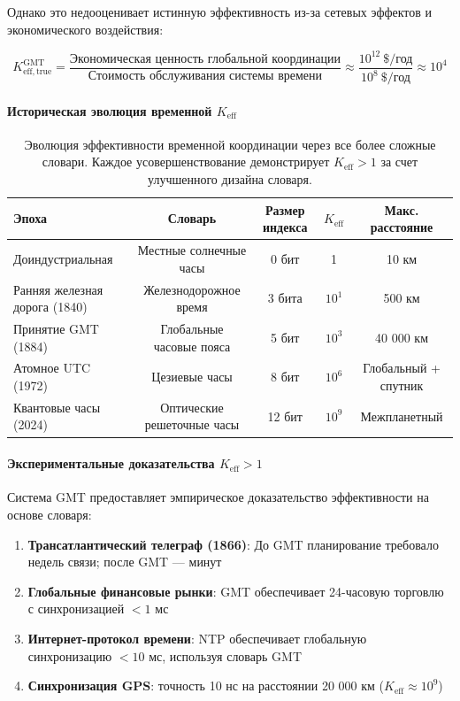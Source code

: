\documentclass[11pt,a4paper]{article}
\begin{document}
	Однако это недооценивает истинную эффективность из-за сетевых эффектов и экономического воздействия:
	
	\begin{equation}
		K_{\mathrm{eff, true}}^{\mathrm{GMT}} = \frac{\text{Экономическая ценность глобальной координации}}{\text{Стоимость обслуживания системы времени}} \approx \frac{10^{12}\ \text{\$/год}}{10^8\ \text{\$/год}} \approx 10^4
	\end{equation}
	
	\paragraph{Историческая эволюция временной $K_{\mathrm{eff}}$}
	\begin{table}[htbp]
		\centering
		\begin{tabular}{lcccc}
			\toprule
			\textbf{Эпоха} & \textbf{Словарь} & \textbf{Размер индекса} & \textbf{$K_{\mathrm{eff}}$} & \textbf{Макс. расстояние} \\
			\midrule
			Доиндустриальная & Местные солнечные часы & 0 бит & 1 & 10 км \\
			Ранняя железная дорога (1840) & Железнодорожное время & 3 бита & $10^1$ & 500 км \\
			Принятие GMT (1884) & Глобальные часовые пояса & 5 бит & $10^3$ & 40 000 км \\
			Атомное UTC (1972) & Цезиевые часы & 8 бит & $10^6$ & Глобальный + спутник \\
			Квантовые часы (2024) & Оптические решеточные часы & 12 бит & $10^9$ & Межпланетный \\
			\bottomrule
		\end{tabular}
		\caption{Эволюция эффективности временной координации через все более сложные словари. Каждое усовершенствование демонстрирует $K_{\mathrm{eff}} > 1$ за счет улучшенного дизайна словаря.}
		\label{tab:time-keff-evolution}
	\end{table}
	
	\paragraph{Экспериментальные доказательства $K_{\mathrm{eff}} > 1$}
	Система GMT предоставляет эмпирическое доказательство эффективности на основе словаря:
	
	\begin{enumerate}
		\item \textbf{Трансатлантический телеграф (1866)}: До GMT планирование требовало недель связи; после GMT — минут
		
		\item \textbf{Глобальные финансовые рынки}: GMT обеспечивает 24-часовую торговлю с синхронизацией $<1$ мс
		
		\item \textbf{Интернет-протокол времени}: NTP обеспечивает глобальную синхронизацию $<10$ мс, используя словарь GMT
		
		\item \textbf{Синхронизация GPS}: точность 10 нс на расстоянии 20 000 км ($K_{\mathrm{eff}} \approx 10^9$)
	\end{enumerate}
	
\end{document}
